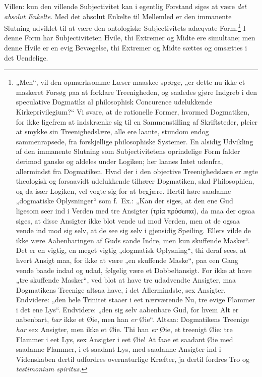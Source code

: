 \documentclass[12pt]{book}
\newcommand{\opage}[1]{\marginnote{\footnotesize\textit{[#1]}}}
\begin{document}
\opage{343}Villen: kun den villende Subjectivitet kan i egentlig Forstand siges at være \emph{det absolut Enkelte}. Med det absolut Enkelte til Mellemled er den immanente Slutning udviklet til at være den ontologiske Subjectivitets adæqvate Form.\footnote{„Men“, vil den opmærksomme Læser maaskee spørge, „er dette nu ikke et maskeret Forsøg paa at forklare Treenigheden, og saaledes gjøre Indgreb i den speculative Dogmatiks al philosophisk Concurence udelukkende Kirkeprivilegium?“ Vi svare, at de rationelle Former, hvormed Dogmatiken, for ikke ligefrem at indskrænke sig til en Sammenstilling af Skriftsteder, pleier at smykke sin Treenighedslære, alle ere laante, stundom endog sammenrapsede, fra forskjellige philosophiske Systemer. En alsidig Udvikling af den immanente Slutning som Subjectivitetens oprindelige Form falder derimod ganske og aldeles under Logiken; her laanes Intet udenfra, allermindst fra Dogmatiken. Hvad der i den objective Treenighedslære er ægte theologisk og forsaavidt udelukkende tilhører Dogmatiken, skal Philosophien, og da især Logiken, vel vogte sig for at begjære. Hertil høre saadanne „dogmatiske Oplysninger“ som f.\ Ex.: „Kan der siges, at den ene Gud ligesom seer ind i Verden med tre Ansigter (τρία πρόσωπα), da maa der ogsaa siges, at disse Ansigter ikke blot vende ud mod Verden, men at de ogsaa vende ind mod sig selv, at de see sig selv i gjensidig Speiling. Ellers vilde de ikke være Aabenbaringen af Guds sande Indre, men kun skuffende Masker“. Det er en vigtig, en meget vigtig „dogmatisk Oplysning“, thi deraf sees, at hvert Ansigt maa, for ikke at være „en skuffende Maske“, paa een Gang vende baade indad og udad, følgelig være et Dobbeltansigt. For ikke at have „tre skuffende Masker“, ved blot at have tre udadvendte Ansigter, maa Dogmatikens Treenige altsaa have, i det Allermindste, sex Ansigter. Endvidere: „den hele Trinitet staaer i eet nærværende Nu, tre evige Flammer i det ene Lys“. Endvidere: „den sig selv aabenbare Gud, for hvem Alt er aabenbart, \emph{har} ikke et Øie, men han \emph{er} Øie“. Altsaa: Dogmatikens Treenige \emph{har} sex Ansigter, men ikke et Øie. Thi han \emph{er} Øie, et treenigt Øie: tre Flammer i eet Lys, sex Ansigter i eet Øie! At faae et saadant Øie med saadanne Flammer, i et saadant Lys, med saadanne Ansigter ind i Videnskaben dertil udfordres overnaturlige Kræfter, ja dertil fordres Tro og \textit{testimonium spiritus}.}%
{} I
\opage{344}denne Form har Subjectiviteten Hvile, thi Extremer og Midte ere simultane; men denne Hvile er en evig Bevægelse, thi Extremer og Midte sættes og omsættes i det Uendelige.
\end{document}
